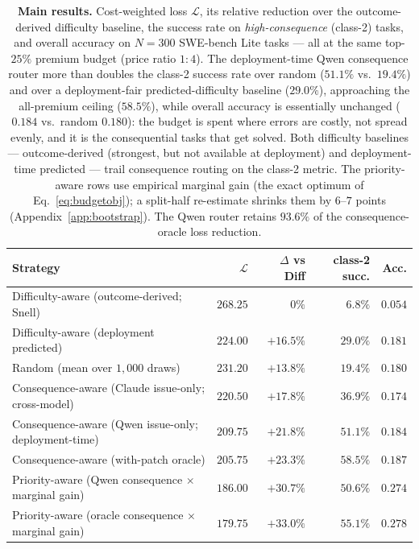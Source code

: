 \documentclass{article}
\begin{document}
\begin{table}[t]
\centering
\caption{\textbf{Main results.} Cost-weighted loss $\mathcal{L}$, its
relative reduction over the outcome-derived difficulty baseline, the
success rate on \emph{high-consequence} (class-2) tasks, and overall
accuracy on $N{=}300$ SWE-bench Lite tasks --- all at the same
top-$25\%$ premium budget (price ratio $1{:}4$). The deployment-time
Qwen consequence router more than doubles the class-2 success rate over
random ($51.1\%$ vs.\ $19.4\%$) and over a deployment-fair
predicted-difficulty baseline ($29.0\%$), approaching the all-premium
ceiling ($58.5\%$), while overall accuracy is essentially unchanged
($0.184$ vs.\ random $0.180$): the budget is spent where errors are
costly, not spread evenly, and it is the consequential tasks that get
solved. Both difficulty baselines --- outcome-derived (strongest, but
not available at deployment) and deployment-time predicted --- trail
consequence routing on the class-2 metric. The priority-aware rows use
empirical marginal gain (the exact optimum of Eq.~\ref{eq:budgetobj});
a split-half re-estimate shrinks them by $6$--$7$ points
(Appendix~\ref{app:bootstrap}). The Qwen router retains $93.6\%$ of the
consequence-oracle loss reduction.}
\label{tab:main}
\small
\begin{tabular}{lrrrr}
\toprule
Strategy & $\mathcal{L}$ & $\Delta$ vs Diff & class-2 succ. & Acc. \\
\midrule
Difficulty-aware (outcome-derived; Snell)~\citep{snell2024scaling}   & $268.25$ & ~~$0\%$ & $6.8\%$ & $0.054$ \\
Difficulty-aware (deployment predicted)                             & $224.00$ & $+16.5\%$ & $29.0\%$ & $0.181$ \\
Random (mean over $1{,}000$ draws)                                  & $231.20$ & $+13.8\%$ & $19.4\%$ & $0.180$ \\
\midrule
Consequence-aware (Claude issue-only; cross-model)                  & $220.50$ & $+17.8\%$ & $36.9\%$ & $0.174$ \\
Consequence-aware (Qwen issue-only; deployment-time)                & $209.75$ & $+21.8\%$ & $\mathbf{51.1\%}$ & $0.184$ \\
Consequence-aware (with-patch oracle)                               & $205.75$ & $+23.3\%$ & $58.5\%$ & $0.187$ \\
\midrule
Priority-aware (Qwen consequence $\times$ marginal gain)            & $\mathbf{186.00}$ & $\mathbf{+30.7\%}$ & $50.6\%$ & $\mathbf{0.274}$ \\
Priority-aware (oracle consequence $\times$ marginal gain)          & $179.75$ & $+33.0\%$ & $55.1\%$ & $0.278$ \\
\bottomrule
\end{tabular}
\end{table}
\end{document}
